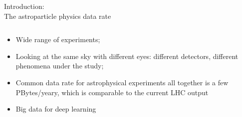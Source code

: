 \begin{frame}{Introduction: \\The astroparticle physics data rate}
\begin{columns}
\begin{column}[t]{0.53\textwidth}
    \begin{itemize}
    \item Wide range of experiments;
    \item Looking at the same sky with different eyes: different detectors, different phenomena under the study;
    \item Common data rate for astrophysical experiments all together is a few PBytes/yeary, which is comparable to the current LHC output\footnotemark[1] %
    \item Big data for deep learning
    \end{itemize}

  \end{column}
\end{columns}
  \footnotesize{}
\end{frame}

